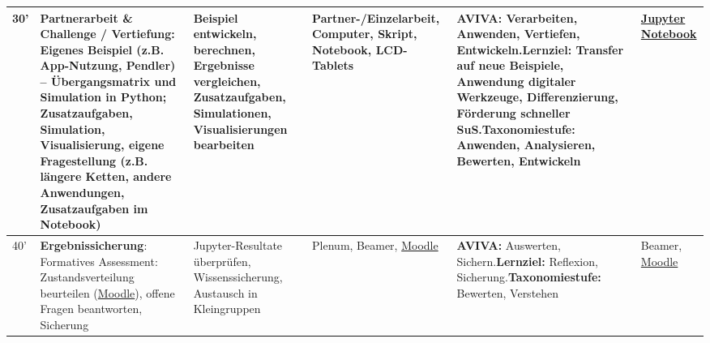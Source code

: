 \begin{landscape}
\begin{longtable}{@{}l|p{5cm}|p{5cm}|p{4cm}|p{5cm}|p{5cm}@{}}
            30' & \textbf{Partnerarbeit \& Challenge / Vertiefung}: Eigenes Beispiel (z.B. App-Nutzung, Pendler) -- Übergangsmatrix und Simulation in Python; Zusatzaufgaben, Simulation, Visualisierung, eigene Fragestellung (z.B. längere Ketten, andere Anwendungen, Zusatzaufgaben im Notebook) & Beispiel entwickeln, berechnen, Ergebnisse vergleichen, Zusatzaufgaben, Simulationen, Visualisierungen bearbeiten & Partner-/Einzelarbeit, Computer, Skript, Notebook, LCD-Tablets & \textbf{AVIVA:} Verarbeiten, Anwenden, Vertiefen, Entwickeln.\newline\textbf{Lernziel:} Transfer auf neue Beispiele, Anwendung digitaler Werkzeuge, Differenzierung, Förderung schneller SuS.\newline\textbf{Taxonomiestufe:} Anwenden, Analysieren, Bewerten, Entwickeln & \href{https://cyrilblum.github.io/datascience-jupyter/lab/index.html}{Jupyter Notebook} \\\midrule
            40' & \textbf{Ergebnissicherung}: Formatives Assessment: Zustandsverteilung beurteilen (\href{https://moodle.kzn.ch}{Moodle}), offene Fragen beantworten, Sicherung & Jupyter-Resultate überprüfen, Wissenssicherung, Austausch in Kleingruppen & Plenum, Beamer, \href{https://moodle.kzn.ch}{Moodle} & \textbf{AVIVA:} Auswerten, Sichern.\newline\textbf{Lernziel:} Reflexion, Sicherung.\newline\textbf{Taxonomiestufe:} Bewerten, Verstehen & Beamer, \href{https://moodle.kzn.ch}{Moodle} \\
        \end{longtable}
\end{landscape}
\restoregeometry
